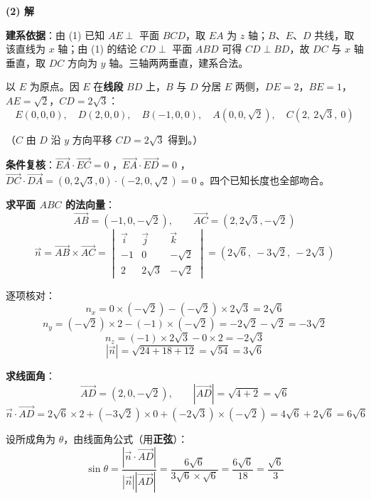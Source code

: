 \begin{answer}
\par\medskip

\textbf{(2) 解}

\textbf{建系依据}：由 (1) 已知 $AE\perp$ 平面 $BCD$，取 $EA$ 为 $z$ 轴；$B$、$E$、$D$ 共线，取该直线为 $x$ 轴；由 (1) 的结论 $CD\perp$ 平面 $ABD$ 可得 $CD\perp BD$，故 $DC$ 与 $x$ 轴垂直，取 $DC$ 方向为 $y$ 轴。三轴两两垂直，建系合法。

以 $E$ 为原点。因 $E$ 在\textbf{线段} $BD$ 上，$B$ 与 $D$ 分居 $E$ 两侧，$DE=2$，$BE=1$，$AE=\sqrt2$，$CD=2\sqrt3$：
\nopagebreak[4]
\[E(0,0,0),\quad D(2,0,0),\quad B(-1,0,0),\quad A\left(0,0,\sqrt2\right),\quad C\left(2,\ 2\sqrt3,\ 0\right)\]

（$C$ 由 $D$ 沿 $y$ 方向平移 $CD=2\sqrt3$ 得到。）

\textbf{条件复核}：$\overrightarrow{EA}\cdot\overrightarrow{EC}=0$ ，$\overrightarrow{EA}\cdot\overrightarrow{ED}=0$ ，$\overrightarrow{DC}\cdot\overrightarrow{DA}=\left(0,2\sqrt3,0\right)\cdot\left(-2,0,\sqrt2\right)=0$ 。四个已知长度也全部吻合。

\textbf{求平面 $ABC$ 的法向量}：
\nopagebreak[4]
\[\overrightarrow{AB}=\left(-1,0,-\sqrt2\right),\qquad \overrightarrow{AC}=\left(2,2\sqrt3,-\sqrt2\right)\]
\nopagebreak[4]
\[\vec n=\overrightarrow{AB}\times\overrightarrow{AC}=\begin{vmatrix}\vec i&\vec j&\vec k\\-1&0&-\sqrt2\\2&2\sqrt3&-\sqrt2\end{vmatrix}=\left(2\sqrt6,\ -3\sqrt2,\ -2\sqrt3\right)\]

逐项核对：
\nopagebreak[4]
\[n_x=0\times\left(-\sqrt2\right)-\left(-\sqrt2\right)\times2\sqrt3=2\sqrt6\]
\nopagebreak[4]
\[n_y=\left(-\sqrt2\right)\times2-\left(-1\right)\times\left(-\sqrt2\right)=-2\sqrt2-\sqrt2=-3\sqrt2\]
\nopagebreak[4]
\[n_z=\left(-1\right)\times2\sqrt3-0\times2=-2\sqrt3\]
\nopagebreak[4]
\[\left|\vec n\right|=\sqrt{24+18+12}=\sqrt{54}=3\sqrt6\]

\textbf{求线面角}：
\nopagebreak[4]
\[\overrightarrow{AD}=\left(2,0,-\sqrt2\right),\qquad \left|\overrightarrow{AD}\right|=\sqrt{4+2}=\sqrt6\]
\nopagebreak[4]
\[\vec n\cdot\overrightarrow{AD}=2\sqrt6\times2+\left(-3\sqrt2\right)\times0+\left(-2\sqrt3\right)\times\left(-\sqrt2\right)=4\sqrt6+2\sqrt6=6\sqrt6\]

设所成角为 $\theta$，由线面角公式（用\textbf{正弦}）：
\nopagebreak[4]
\[\sin\theta=\frac{\left|\vec n\cdot\overrightarrow{AD}\right|}{\left|\vec n\right|\left|\overrightarrow{AD}\right|}=\frac{6\sqrt6}{3\sqrt6\times\sqrt6}=\frac{6\sqrt6}{18}=\frac{\sqrt6}{3}\]


\end{answer}

